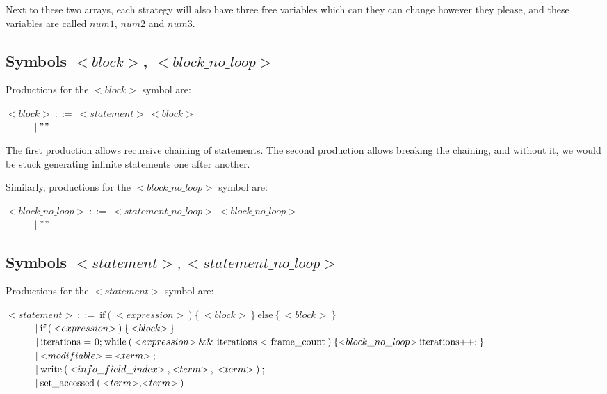 Next to these two arrays, each strategy will also have three free variables which can they can change however they please, and these variables are called $num1$, $num2$ and $num3$.

\subsection{Symbols ${<}block{>}$, ${<}block\_no\_loop{>}$}
Productions for the ${<}block{>}$ symbol are:

\noindent
$ {<}block{>}\:::=\:{<}statement{>}\:{<}block{>}$\\
$ \indent\indent |\:""$

The first production allows recursive chaining of statements. The second production allows breaking the chaining, and without it, we would be stuck generating infinite statements one after another.

Similarly, productions for the ${<}block\_no\_loop{>}$ symbol are:

\noindent
$ {<}block\_no\_loop{>}\:::=\:{<}statement\_no\_loop{>}\:{<}block\_no\_loop{>}$\\
$ \indent\indent |\:""$

\subsection{Symbols ${<}statement{>}, {<}statement\_no\_loop{>}$}
Productions for the ${<}statement{>}$ symbol are:

\noindent
$ {<}statement{>}\:::=\:\text{if}\:\text{(}\:{<}expression{>}\:\text{)}\:\text{\{}\:{<}block{>}\:\text{\}}\:\text{else}\:\text{\{}\:{<}block{>}\:\text{\}} $\\
$ \indent\indent |\:\text{if}\:\text{(}\:{<}expression{>}\:\text{)}\:\text{\{}\:{<}block{>}\:\text{\}}$\\
$ \indent\indent |\:\text{iterations = 0;}\:\text{while}\:\text{(}\:{<}expression{>}\:\text{\&\& iterations < frame\_count}\:\text{)}\:\text{\{}\:\\{<}block\_no\_loop{>}\:\text{iterations++;}\:\text{\}} $\\
$ \indent\indent |\:{<}modifiable{>}\:\text{=}\:{<}term{>}\:\text{;} $\\
$ \indent\indent |\:\text{write}\:\text{(}\:{<}info\_field\_index{>}\:\text{,}\:{<}term{>}\:\text{,}\:\:{<}term{>}\:\text{)}\:\text{;} $\\
$ \indent\indent |\:\text{set\_accessed}\:\text{(}\:{<}term{>}\text{,}{<}term{>}\:\text{)}$

